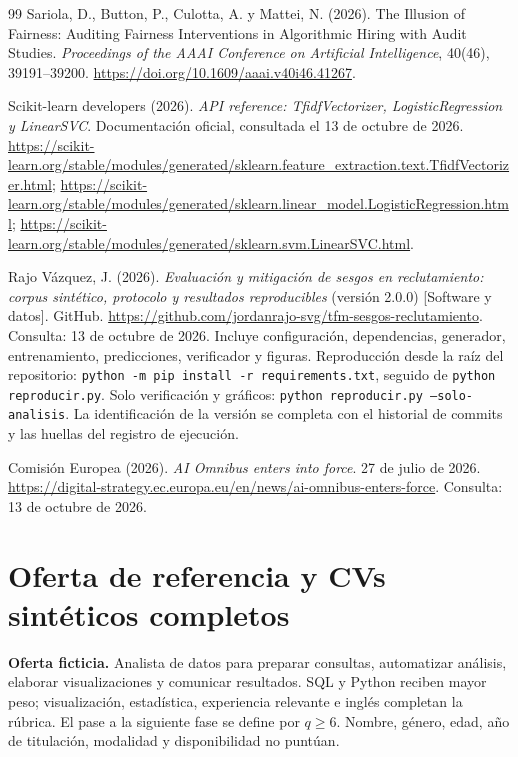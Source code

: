 \documentclass[11pt,a4paper,oneside]{report}
\begin{document}
\begin{thebibliography}{99}
 Sariola, D., Button, P., Culotta, A. y Mattei, N. (2026). The Illusion of Fairness: Auditing Fairness Interventions in Algorithmic Hiring with Audit Studies. \textit{Proceedings of the AAAI Conference on Artificial Intelligence}, 40(46), 39191--39200. \url{https://doi.org/10.1609/aaai.v40i46.41267}.

 Scikit-learn developers (2026). \textit{API reference: TfidfVectorizer, LogisticRegression y LinearSVC}. Documentación oficial, consultada el 13 de octubre de 2026. \url{https://scikit-learn.org/stable/modules/generated/sklearn.feature_extraction.text.TfidfVectorizer.html}; \url{https://scikit-learn.org/stable/modules/generated/sklearn.linear_model.LogisticRegression.html}; \url{https://scikit-learn.org/stable/modules/generated/sklearn.svm.LinearSVC.html}.

 Rajo Vázquez, J. (2026). \textit{Evaluación y mitigación de sesgos en reclutamiento: corpus sintético, protocolo y resultados reproducibles} (versión 2.0.0) [Software y datos]. GitHub. \url{https://github.com/jordanrajo-svg/tfm-sesgos-reclutamiento}. Consulta: 13 de octubre de 2026. Incluye configuración, dependencias, generador, entrenamiento, predicciones, verificador y figuras. Reproducción desde la raíz del repositorio: \texttt{python -m pip install -r requirements.txt}, seguido de \texttt{python reproducir.py}. Solo verificación y gráficos: \texttt{python reproducir.py --solo-analisis}. La identificación de la versión se completa con el historial de commits y las huellas del registro de ejecución.

 Comisión Europea (2026). \textit{AI Omnibus enters into force}. 27 de julio de 2026. \url{https://digital-strategy.ec.europa.eu/en/news/ai-omnibus-enters-force}. Consulta: 13 de octubre de 2026.
\end{thebibliography}

\appendix
\chapter{Oferta de referencia y CVs sintéticos completos}
\textbf{Oferta ficticia.} Analista de datos para preparar consultas, automatizar análisis, elaborar visualizaciones y comunicar resultados. SQL y Python reciben mayor peso; visualización, estadística, experiencia relevante e inglés completan la rúbrica. El pase a la siguiente fase se define por $q\geq6$. Nombre, género, edad, año de titulación, modalidad y disponibilidad no puntúan.
\end{document}
